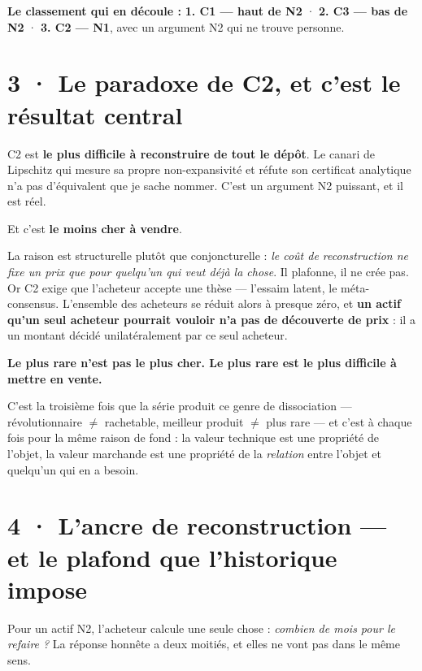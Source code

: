 \documentclass[10pt]{article}
\begin{document}
\begin{acquis}
\textbf{Le classement qui en découle :} \; \textbf{1. C1 --- haut de N2} \; · \;
\textbf{2. C3 --- bas de N2} \; · \; \textbf{3. C2 --- N1}, avec un argument N2 qui ne trouve personne.
\end{acquis}

\section{3 · Le paradoxe de C2, et c'est le résultat central}

C2 est \textbf{le plus difficile à reconstruire de tout le dépôt}. Le canari de Lipschitz qui mesure sa
propre non-expansivité et réfute son certificat analytique n'a pas d'équivalent que je sache nommer.
C'est un argument N2 puissant, et il est réel.

Et c'est \textbf{le moins cher à vendre}.

La raison est structurelle plutôt que conjoncturelle : \emph{le coût de reconstruction ne fixe un prix
que pour quelqu'un qui veut déjà la chose}. Il plafonne, il ne crée pas. Or C2 exige que l'acheteur
accepte une thèse --- l'essaim latent, le méta-consensus. L'ensemble des acheteurs se réduit alors à
presque zéro, et \textbf{un actif qu'un seul acheteur pourrait vouloir n'a pas de découverte de prix} :
il a un montant décidé unilatéralement par ce seul acheteur.

\begin{piste}
\textbf{Le plus rare n'est pas le plus cher. Le plus rare est le plus difficile à mettre en vente.}
\end{piste}

C'est la troisième fois que la série produit ce genre de dissociation --- révolutionnaire $\neq$
rachetable, meilleur produit $\neq$ plus rare --- et c'est à chaque fois pour la même raison de fond :
la valeur technique est une propriété de l'objet, la valeur marchande est une propriété de la
\emph{relation} entre l'objet et quelqu'un qui en a besoin.

\section{4 · L'ancre de reconstruction --- et le plafond que l'historique impose}

Pour un actif N2, l'acheteur calcule une seule chose : \emph{combien de mois pour le refaire ?} La
réponse honnête a deux moitiés, et elles ne vont pas dans le même sens.
\end{document}
